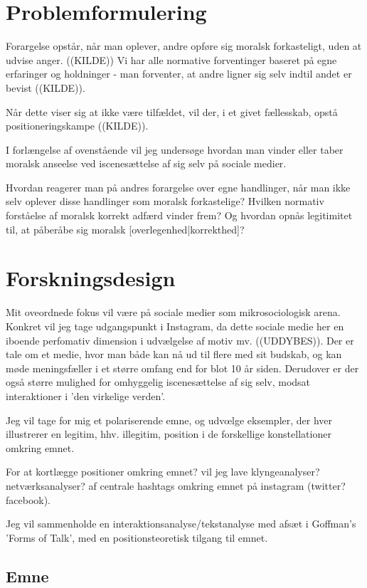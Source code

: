 \section{Problemformulering}

Forargelse opstår, når man oplever, andre opføre sig moralsk forkasteligt,
uden at udvise anger. ((KILDE)) Vi har alle normative forventinger
baseret på egne erfaringer og holdninger - man forventer, at andre ligner sig
selv indtil andet er bevist ((KILDE)).

Når dette viser sig at ikke være tilfældet, vil der, i et givet
fællesskab, opstå positioneringskampe ((KILDE)). 

I forlængelse af ovenstående vil jeg undersøge hvordan man vinder eller taber
moralsk anseelse ved iscenesættelse af sig selv på sociale medier.

Hvordan reagerer man på andres forargelse over egne handlinger, når man ikke
selv oplever disse handlinger som moralsk forkastelige? Hvilken normativ
forståelse af moralsk korrekt adfærd vinder frem? Og hvordan opnås legitimitet
til, at påberåbe sig moralsk [overlegenhed|korrekthed]?

\section{Forskningsdesign}

Mit oveordnede fokus vil være på sociale medier som mikrosociologisk
arena. Konkret vil jeg tage udgangspunkt i Instagram, da dette sociale medie
her en iboende perfomativ dimension i udvælgelse af motiv mv.  ((UDDYBES)).
Der er tale om et medie, hvor man både kan nå ud til flere med sit budskab, og
kan møde meningsfæller i et større omfang end for blot 10 år siden. Derudover
er der også større mulighed for omhyggelig iscenesættelse af sig selv, modsat
interaktioner i 'den virkelige verden'.

Jeg vil tage for mig et polariserende emne, og udvœlge eksempler, der hver
illustrerer en legitim, hhv. illegitim, position i de forskellige
konstellationer omkring emnet.

For at kortlægge positioner omkring emnet? vil jeg lave klyngeanalyser?
netværksanalyser? af centrale hashtags omkring emnet på instagram (twitter?
facebook).

Jeg vil sammenholde en interaktionsanalyse/tekstanalyse med afsæt i Goffman's
'Forms of Talk', med en positionsteoretisk tilgang til emnet.

\subsection{Emne}

